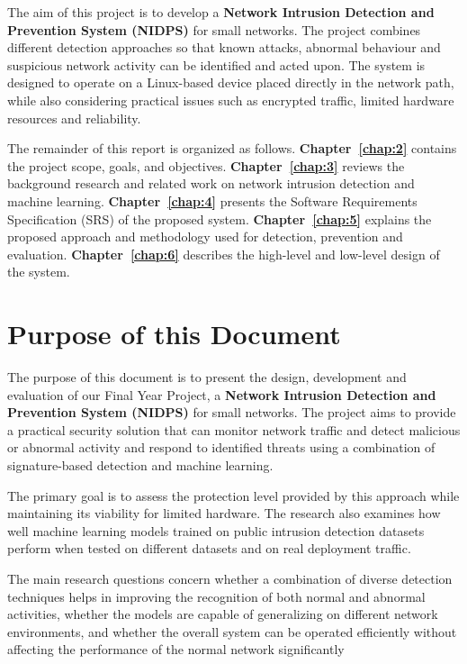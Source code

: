 \noindent The aim of this project is to develop a \textbf{Network Intrusion Detection and Prevention System (NIDPS)} for small networks. The project combines different detection approaches so that known attacks, abnormal behaviour and suspicious network activity can be identified and acted upon. The system is designed to operate on a Linux-based device placed directly in the network path, while also considering practical issues such as encrypted traffic, limited hardware resources and reliability.

\noindent The remainder of this report is organized as follows. \textbf{Chapter~\ref{chap:2}} contains the project scope, goals, and objectives. \textbf{Chapter~\ref{chap:3}} reviews the background research and related work on network intrusion detection and machine learning. \textbf{Chapter~\ref{chap:4}} presents the Software Requirements Specification (SRS) of the proposed system. \textbf{Chapter~\ref{chap:5}} explains the proposed approach and methodology used for detection, prevention and evaluation. \textbf{Chapter~\ref{chap:6}} describes the high-level and low-level design of the system.

\section{Purpose of this Document}\label{sec:1.1}

\noindent The purpose of this document is to present the design, development and evaluation of our Final Year Project, a \textbf{Network Intrusion Detection and Prevention System (NIDPS)} for small networks. The project aims to provide a practical security solution that can monitor network traffic and detect malicious or abnormal activity and respond to identified threats using a combination of signature-based detection and machine learning.

\noindent The primary goal is to assess the protection level provided by this approach while maintaining its viability for limited hardware. The research also examines how well machine learning models trained on public intrusion detection datasets perform when tested on different datasets and on real deployment traffic.

\noindent The main research questions concern whether a combination of diverse detection techniques helps in improving the recognition of both normal and abnormal activities, whether the models are capable of generalizing on different network environments, and whether the overall system can be operated efficiently without affecting the performance of the normal network significantly

